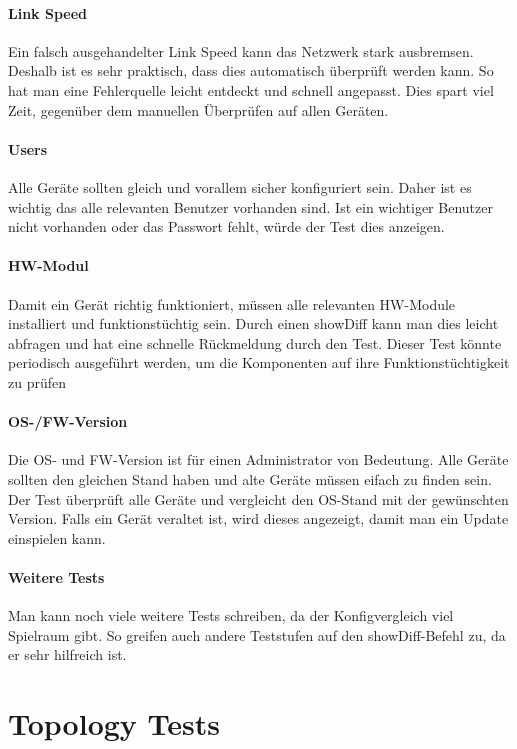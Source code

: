 \documentclass[a4,12pt]{scrartcl}
\begin{document}
\paragraph{Link Speed}\newline
Ein falsch ausgehandelter Link Speed kann das Netzwerk stark ausbremsen. Deshalb ist es sehr praktisch, dass dies automatisch überprüft werden kann. So hat man eine Fehlerquelle leicht entdeckt und schnell angepasst. Dies spart viel Zeit, gegenüber dem manuellen Überprüfen auf allen Geräten.
\paragraph{Users}\newline
Alle Geräte sollten gleich und vorallem sicher konfiguriert sein. Daher ist es wichtig das alle relevanten Benutzer vorhanden sind. Ist ein wichtiger Benutzer nicht vorhanden oder das Passwort fehlt, würde der Test dies anzeigen.
\paragraph{HW-Modul}\newline
Damit ein Gerät richtig funktioniert, müssen alle relevanten HW-Module installiert und funktionstüchtig sein. Durch einen showDiff kann man dies leicht abfragen und hat eine schnelle Rückmeldung durch den Test. Dieser Test könnte periodisch ausgeführt werden, um die Komponenten auf ihre Funk­ti­ons­tüch­tig­keit zu prüfen
\paragraph{OS-/FW-Version}\newline
Die OS- und FW-Version ist für einen Administrator von Bedeutung. Alle Geräte sollten den gleichen Stand haben und alte Geräte müssen eifach zu finden sein. Der Test überprüft alle Geräte und vergleicht den OS-Stand mit der gewünschten Version. Falls ein Gerät veraltet ist, wird dieses angezeigt, damit man ein Update einspielen kann.
\paragraph{Weitere Tests}\newline
Man kann noch viele weitere Tests schreiben, da der Konfigvergleich viel Spielraum gibt. So greifen auch andere Teststufen auf den showDiff-Befehl zu, da er sehr hilfreich ist. 
\newpage
\section{Topology Tests}
\end{document}
